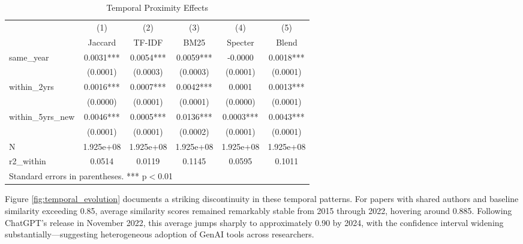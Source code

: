\documentclass[12pt]{article}
\begin{document}
\begin{table}[htbp]\centering
\caption{Temporal Proximity Effects}
\label{tab:temporal}
\begin{tabular}{l*{5}{c}}
\toprule
                    &\multicolumn{1}{c}{(1)}&\multicolumn{1}{c}{(2)}&\multicolumn{1}{c}{(3)}&\multicolumn{1}{c}{(4)}&\multicolumn{1}{c}{(5)}\\
                    &\multicolumn{1}{c}{Jaccard}&\multicolumn{1}{c}{TF-IDF}&\multicolumn{1}{c}{BM25}&\multicolumn{1}{c}{Specter}&\multicolumn{1}{c}{Blend}\\
\midrule
same\_year           &      0.0031***&      0.0054***&      0.0059***&     -0.0000         &      0.0018***\\
                    &    (0.0001)         &    (0.0003)         &    (0.0003)         &    (0.0001)         &    (0.0001)         \\
within\_2yrs         &      0.0016***&      0.0007***&      0.0042***&      0.0001         &      0.0013***\\
                    &    (0.0000)         &    (0.0001)         &    (0.0001)         &    (0.0000)         &    (0.0001)         \\
within\_5yrs\_new     &      0.0046***&      0.0005***&      0.0136***&      0.0003***&      0.0043***\\
                    &    (0.0001)         &    (0.0001)         &    (0.0002)         &    (0.0001)         &    (0.0001)         \\
\midrule
N                   &  1.925e+08         &  1.925e+08         &  1.925e+08         &  1.925e+08         &  1.925e+08         \\
r2\_within           &      0.0514         &      0.0119         &      0.1145         &      0.0595         &      0.1011         \\
\bottomrule
\multicolumn{6}{l}{\footnotesize Standard errors in parentheses. *** p$<$0.01}
\end{tabular}
\end{table}

Figure \ref{fig:temporal_evolution} documents a striking discontinuity in these temporal patterns. For papers with shared authors and baseline similarity exceeding 0.85, average similarity scores remained remarkably stable from 2015 through 2022, hovering around 0.885. Following ChatGPT's release in November 2022, this average jumps sharply to approximately 0.90 by 2024, with the confidence interval widening substantially—suggesting heterogeneous adoption of GenAI tools across researchers.
\end{document}
